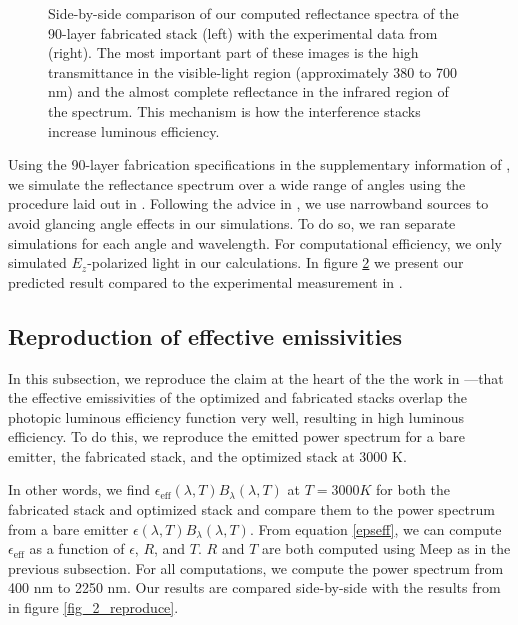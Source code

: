 \documentclass[%
 reprint,
 amsmath,amssymb,
 aps
]{revtex4-2}
\begin{document}
\begin{figure}
\begin{subfigure}{.3\textwidth}
  \label{fig:sub2}
\end{subfigure}
\caption{Side-by-side comparison of our computed reflectance spectra of the 90-layer fabricated stack (left) with the experimental data from \cite{ilic} (right). The most important part of these images is the high transmittance in the visible-light region (approximately 380 to 700 nm) and the almost complete reflectance in the infrared region of the spectrum. This mechanism is how the interference stacks increase luminous efficiency.} 
\label{fig_3_reproduce}
\end{figure}
Using the 90-layer fabrication specifications in the supplementary information of \cite{ilic}, we simulate the reflectance spectrum over a wide range of angles using the procedure laid out in \cite{meep_tutorial}. Following the advice in \cite{meep_tutorial}, we use narrowband sources to avoid glancing angle effects in our simulations. To do so, we ran separate simulations for each angle and wavelength. For computational efficiency, we only simulated $E_z$-polarized light in our calculations. In figure \ref{fig_3_reproduce} we present our predicted result compared to the experimental measurement in \cite{ilic}.


\subsection{Reproduction of effective emissivities}
In this subsection, we reproduce the claim at the heart of the the work in \cite{ilic}---that the effective emissivities of the optimized and fabricated stacks overlap the photopic luminous efficiency function very well, resulting in high luminous efficiency. To do this, we reproduce the emitted power spectrum for a bare emitter, the fabricated stack, and the optimized stack at 3000 K.  

In other words, we find $\epsilon_{\text{eff}} (\lambda, T) B_\lambda (\lambda, T)$ at $T=3000 K$ for both the fabricated stack and optimized stack and compare them to the power spectrum from a bare emitter $\epsilon(\lambda, T) B_\lambda (\lambda, T)$. From equation \ref{epseff}, we can compute $\epsilon_{\text{eff}}$ as a function of $\epsilon$, $R$, and $T$. $R$ and $T$ are both computed using Meep as in the previous subsection. For all computations, we compute the power spectrum from 400 nm to 2250 nm. Our results are compared side-by-side with the results from \cite{ilic} in figure \ref{fig_2_reproduce}.
\end{document}
